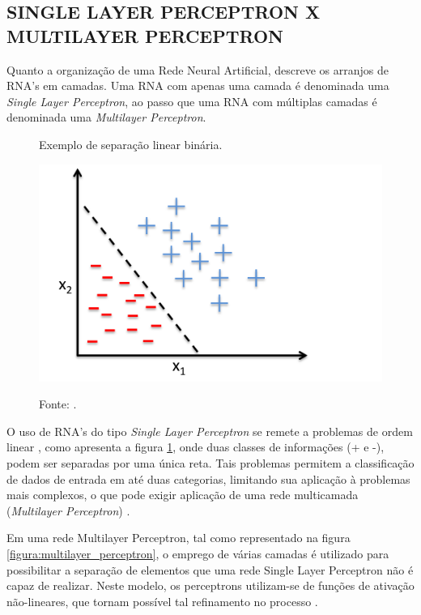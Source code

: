 \subsection{SINGLE LAYER PERCEPTRON X MULTILAYER PERCEPTRON}

Quanto a organização de uma Rede Neural Artificial,  descreve os arranjos de RNA's em camadas. Uma RNA com apenas uma camada é denominada uma \textit{Single Layer Perceptron}, ao passo que uma RNA com múltiplas camadas é denominada uma \textit{Multilayer Perceptron}.

\begin{figure}[h]
	\caption{Exemplo de separação linear binária.}
	\centering %
	\includegraphics[width=14cm]{resources/perceptron_binary.png} %
	\label{figura:perceptron_binary}	
	\caption*{Fonte: .}
\end{figure}

O uso de RNA's do tipo \textit{Single Layer Perceptron} se remete a problemas de ordem linear \cite{haykin2009neural}, como apresenta a figura \ref{figura:perceptron_binary}, onde duas classes de informações (+ e -), podem ser separadas por uma única reta. Tais problemas permitem a classificação de dados de entrada em até duas categorias, limitando sua aplicação à problemas mais complexos, o que pode exigir aplicação de uma rede multicamada (\textit{Multilayer Perceptron}) \cite{fausett1994fundamentals}.

Em uma rede Multilayer Perceptron, tal como representado na figura \ref{figura:multilayer_perceptron}, o emprego de várias camadas é utilizado para possibilitar a separação de elementos que uma rede Single Layer Perceptron não é capaz de realizar. Neste modelo, os perceptrons utilizam-se de funções de ativação não-lineares, que tornam possível tal refinamento no processo \cite{marius2009}.

